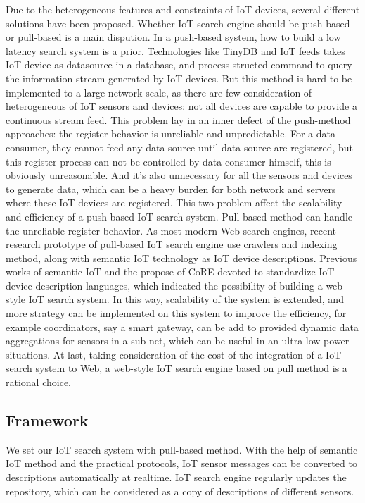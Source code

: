 \documentclass[conference]{IEEEtran}
\begin{document}
%
Due to the heterogeneous features and constraints of IoT devices, several different solutions have been proposed. Whether IoT search engine should be push-based or pull-based is a main dispution. 
In a push-based system, how to build a low latency search system is a prior. Technologies like TinyDB\cite{TinyDB} and IoT feeds\cite{Whitehouse2006} takes IoT device as datasource in a database, and process structed command to query the information stream generated by IoT devices. 
But this method is hard to be implemented to a large network scale, as there are few consideration of heterogeneous of IoT sensors and devices: not all devices are capable to provide a continuous stream feed. This problem lay in an inner defect of the push-method approaches: the register behavior is unreliable and unpredictable. For a data consumer, they cannot feed any data source until data source are registered, but this register process can not be controlled by data consumer himself, this is obviously unreasonable. And it's also unnecessary for all the sensors and devices to generate data, which can be a heavy burden for both network and servers where these IoT devices are registered. This two problem affect the scalability and efficiency of a push-based IoT search system.
%
Pull-based method can handle the unreliable register behavior. As most modern Web search engines, recent research prototype\cite{Dyser} of pull-based IoT search engine use crawlers and indexing method, along with semantic IoT technology as IoT device descriptions. Previous works of semantic IoT\cite{Compton2012} and the propose of CoRE\cite{CoREWorkingGroup2012} devoted to standardize IoT device description languages, which indicated the possibility of building a web-style IoT search system. 
In this way, scalability of the system is extended, and more strategy can be implemented on this system to improve the efficiency, for example coordinators, say a smart gateway, can be add to provided dynamic data aggregations for sensors in a sub-net, which can be useful in an ultra-low power situations. At last, taking consideration of the cost of the integration of a IoT search system to Web, a web-style IoT search engine based on pull method is a rational choice.

\subsection{Framework}
We set our IoT search system with pull-based method. With the help of semantic IoT method and the practical protocols, IoT sensor messages can be converted to descriptions automatically at realtime. IoT search engine regularly updates the repository, which can be considered as a copy of descriptions of different sensors.
\end{document}
